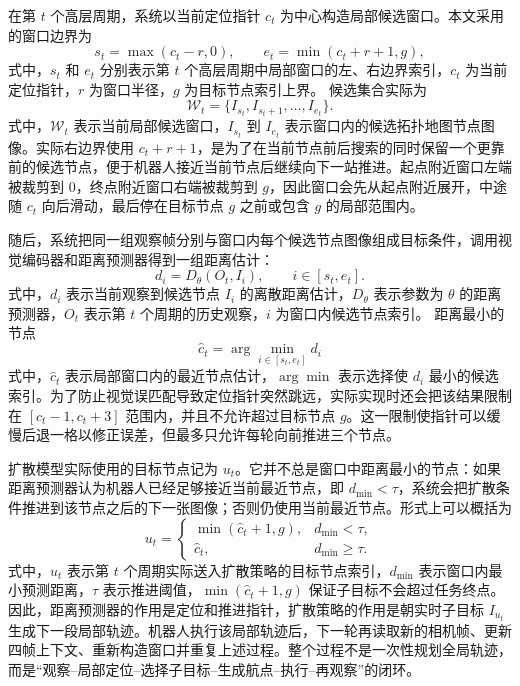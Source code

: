 在第 $t$ 个高层周期，系统以当前定位指针 $c_t$ 为中心构造局部候选窗口。本文采用的窗口边界为
\begin{equation}
s_t=\max(c_t-r,0),\qquad e_t=\min(c_t+r+1,g),
\end{equation}
式中，$s_t$ 和 $e_t$ 分别表示第 $t$ 个高层周期中局部窗口的左、右边界索引，$c_t$ 为当前定位指针，$r$ 为窗口半径，$g$ 为目标节点索引上界。
候选集合实际为
\begin{equation}
\mathcal{W}_t=\{I_{s_t},I_{s_t+1},\ldots,I_{e_t}\}.
\end{equation}
式中，$\mathcal{W}_t$ 表示当前局部候选窗口，$I_{s_t}$ 到 $I_{e_t}$ 表示窗口内的候选拓扑地图节点图像。实际右边界使用 $c_t+r+1$，是为了在当前节点前后搜索的同时保留一个更靠前的候选节点，便于机器人接近当前节点后继续向下一站推进。起点附近窗口左端被裁剪到 0，终点附近窗口右端被裁剪到 $g$，因此窗口会先从起点附近展开，中途随 $c_t$ 向后滑动，最后停在目标节点 $g$ 之前或包含 $g$ 的局部范围内。

随后，系统把同一组观察帧分别与窗口内每个候选节点图像组成目标条件，调用视觉编码器和距离预测器得到一组距离估计：
\begin{equation}
d_i = D_\theta(O_t, I_i),\qquad i\in[s_t,e_t].
\end{equation}
式中，$d_i$ 表示当前观察到候选节点 $I_i$ 的离散距离估计，$D_\theta$ 表示参数为 $\theta$ 的距离预测器，$O_t$ 表示第 $t$ 个周期的历史观察，$i$ 为窗口内候选节点索引。
距离最小的节点
\begin{equation}
\hat{c}_t=\arg\min_{i\in[s_t,e_t]}d_i
\end{equation}
式中，$\hat{c}_t$ 表示局部窗口内的最近节点估计，$\arg\min$ 表示选择使 $d_i$ 最小的候选索引。为了防止视觉误匹配导致定位指针突然跳远，实际实现时还会把该结果限制在 $[c_t-1,c_t+3]$ 范围内，并且不允许超过目标节点 $g$。这一限制使指针可以缓慢后退一格以修正误差，但最多只允许每轮向前推进三个节点。

扩散模型实际使用的目标节点记为 $u_t$。它并不总是窗口中距离最小的节点：如果距离预测器认为机器人已经足够接近当前最近节点，即 $d_{\min}<\tau$，系统会把扩散条件推进到该节点之后的下一张图像；否则仍使用当前最近节点。形式上可以概括为
\begin{equation}
u_t=
\begin{cases}
\min(\hat{c}_t+1,g), & d_{\min}<\tau,\\
\hat{c}_t, & d_{\min}\ge \tau.
\end{cases}
\end{equation}
式中，$u_t$ 表示第 $t$ 个周期实际送入扩散策略的目标节点索引，$d_{\min}$ 表示窗口内最小预测距离，$\tau$ 表示推进阈值，$\min(\hat{c}_t+1,g)$ 保证子目标不会超过任务终点。因此，距离预测器的作用是定位和推进指针，扩散策略的作用是朝实时子目标 $I_{u_t}$ 生成下一段局部轨迹。机器人执行该局部轨迹后，下一轮再读取新的相机帧、更新四帧上下文、重新构造窗口并重复上述过程。整个过程不是一次性规划全局轨迹，而是“观察--局部定位--选择子目标--生成航点--执行--再观察”的闭环。

